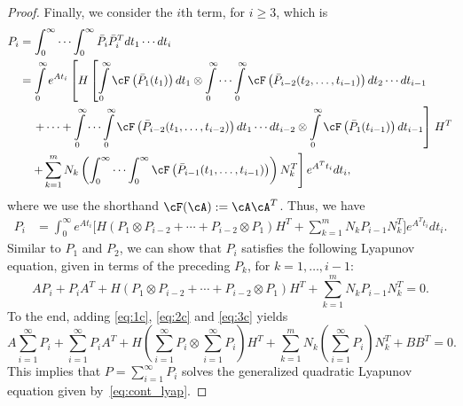 \begin{proof}
Finally, we consider the $i$th term, for $i\geq 3$, which is
\begin{align*}
P_i &= \int_0^\infty\cdots \int_0^\infty \bar P_i \bar P_i^T dt_1\cdots dt_i\\
&=  \int\limits_0^\infty e^{At_i}\left[H \left[\int\limits_0^\infty\cF\left(\bar P_1(t_1)\right) dt_1\otimes\int\limits_0^\infty\cdots \int\limits_0^\infty \cF\left(\bar P_{i-2}(t_{2},\ldots,t_{i-1})\right) dt_2\cdots dt_{i-1}  \right.\right.\\
&\quad\left.\left.+\cdots + \int\limits_0^\infty\cdots \int\limits_0^\infty \cF\left(\bar P_{i-2}(t_{1},\ldots,t_{i-2}) \right) dt_1\cdots dt_{i-2}\otimes  \int\limits_0^\infty  \cF\left(\bar P_1(t_{i-1}) \right)dt_{i-1}\right]\right.H^T \\
&\quad \left.+  \sum_{k=1}^m N_k \left(\int_0^\infty\cdots \int_0^\infty \cF\left(\bar P_{i-1}(t_1,\ldots,t_{i-1})\right) \right)N_k^T\right]e^{A^Tt_i}dt_i,
\end{align*}
where  we use the shorthand  $\cF(\cA) := \cA\cA^T$. Thus, we have
\begin{align*}
P_i &=  \int_0^\infty e^{At_i}\Big[H(P_1\otimes P_{i-2} + \cdots + P_{i-2}\otimes P_1)H^T + \sum_{k=1}^mN_kP_{i-1}N_k^T\Big]e^{A^Tt_i}dt_i.
\end{align*}
Similar to $P_1$ and $P_2$, we can show that $P_i$ satisfies the following Lyapunov equation, given in terms of the preceding $P_k$, for $k = {1,\ldots,i-1}$:
\begin{equation}\label{eq:3c}
AP_i+P_iA^T + H(P_1\otimes P_{i-2} + \cdots + P_{i-2}\otimes P_1)H^T + \sum_{k=1}^mN_kP_{i-1}N_k^T = 0.
\end{equation}
To the end, adding \eqref{eq:1c}, \eqref{eq:2c} and \eqref{eq:3c} yields
\begin{equation*}
A\left.\sum_{i=1}^\infty P_i\right. + \left.\sum_{i=1}^\infty P_i\right.A^T + H\left(\sum_{i=1}^\infty P_i \otimes \sum_{i=1}^\infty P_i \right)H^T + \sum_{k=1}^m N_k\left(\sum_{i=1}^\infty P_i\right) N_k^T +BB^T = 0.
\end{equation*}
This implies that $P = \sum_{i=1}^\infty P_i$ solves the generalized quadratic  Lyapunov equation given by~\eqref{eq:cont_lyap}.
\end{proof}

